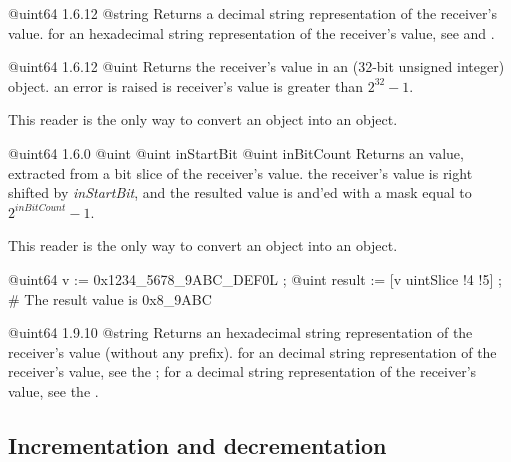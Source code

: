 {@uint64}
{1.6.12}
{@string}
{Returns a decimal string representation of the receiver's value.}
{for an hexadecimal string representation of the receiver's value, see  and .}



{@uint64}
{1.6.12}
{@uint}
{Returns the receiver's value in an  (32-bit unsigned integer) object.}
{an error is raised is receiver's value is greater than $2^{32}-1$.}

This reader is the only way to convert an  object into an  object.


{@uint64}
{1.6.0}
{@uint}
{@uint inStartBit}
{@uint inBitCount}
{Returns an  value, extracted from a bit slice of the receiver's value.}
{the receiver's value is right shifted by \emph{inStartBit}, and the resulted value is and'ed with a mask equal to $2^{inBitCount}-1$.}

This reader is the only way to convert an  object into an  object.


\exempleDeuxLignes
{}
{@uint64 v := 0x1234\_5678\_9ABC\_DEF0L ;}
{@uint result := [v uintSlice !4 !5] ; \# The result value is 0x8\_9ABC}





{@uint64}
{1.9.10}
{@string}
{Returns an hexadecimal string representation of the receiver's value (without any prefix).}
{for an decimal string representation of the receiver's value, see the ; for a decimal string representation of the receiver's value, see the .}






\subsection{Incrementation and decrementation}

